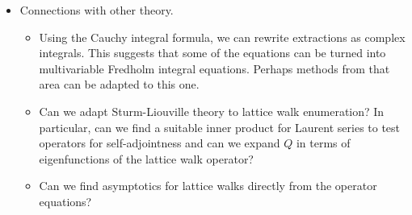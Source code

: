 \begin{itemize}
\item Connections with other theory.
\begin{itemize}
	\item Using the Cauchy integral formula, we can rewrite extractions as complex integrals. This suggests that some of the equations can be turned into multivariable Fredholm integral equations. Perhaps methods from that area can be adapted to this one.
	\item Can we adapt Sturm-Liouville theory to lattice walk enumeration? In particular, can we find a suitable inner product for Laurent series to test operators for self-adjointness and can we expand $Q$ in terms of eigenfunctions of the lattice walk operator?
	\item Can we find asymptotics for lattice walks directly from the operator equations?
\end{itemize}
\end{itemize}
\endinput
